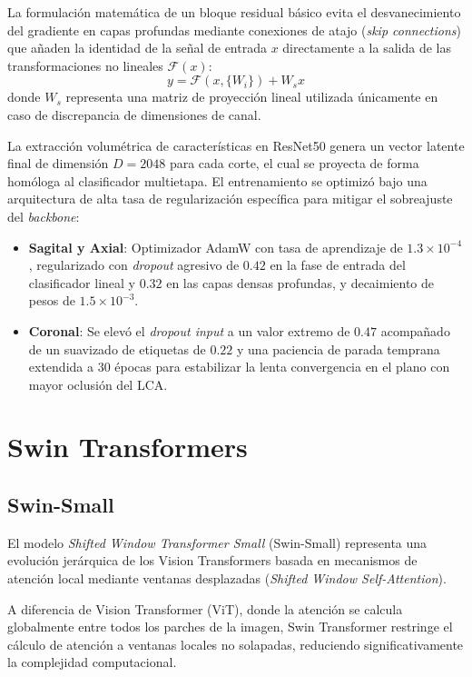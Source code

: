 La formulación matemática de un bloque residual básico evita el desvanecimiento del gradiente en capas profundas mediante conexiones de atajo (\textit{skip connections}) que añaden la identidad de la señal de entrada $x$ directamente a la salida de las transformaciones no lineales $\mathcal{F}(x)$:
\begin{equation}
    y = \mathcal{F}(x, \{W_i\}) + W_s x
\end{equation}
donde $W_s$ representa una matriz de proyección lineal utilizada únicamente en caso de discrepancia de dimensiones de canal. 

La extracción volumétrica de características en ResNet50 genera un vector latente final de dimensión $D = 2048$ para cada corte, el cual se proyecta de forma homóloga al clasificador multietapa. El entrenamiento se optimizó bajo una arquitectura de alta tasa de regularización específica para mitigar el sobreajuste del \textit{backbone}:
\begin{itemize}
    \item \textbf{Sagital y Axial}: Optimizador AdamW con tasa de aprendizaje de $1.3 \times 10^{-4}$, regularizado con \textit{dropout} agresivo de $0.42$ en la fase de entrada del clasificador lineal y $0.32$ en las capas densas profundas, y decaimiento de pesos de $1.5 \times 10^{-3}$.
    \item \textbf{Coronal}: Se elevó el \textit{dropout input} a un valor extremo de $0.47$ acompañado de un suavizado de etiquetas de $0.22$ y una paciencia de parada temprana extendida a 30 épocas para estabilizar la lenta convergencia en el plano con mayor oclusión del LCA.
\end{itemize}

\section{Swin Transformers}

\subsection{Swin-Small}
\label{subsec:swin_small}

El modelo \textit{Shifted Window Transformer Small} (Swin-Small) \cite{liu2021swin} representa una evolución jerárquica de los Vision Transformers basada en mecanismos de atención local mediante ventanas desplazadas (\textit{Shifted Window Self-Attention}).

A diferencia de Vision Transformer (ViT), donde la atención se calcula globalmente entre todos los parches de la imagen, Swin Transformer restringe el cálculo de atención a ventanas locales no solapadas, reduciendo significativamente la complejidad computacional.

